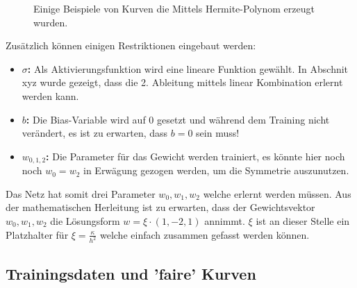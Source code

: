 \begin{figure}
	\centering
	
	\label{fig:mst_neuronalnetworkdemo}
	\caption{Einige Beispiele von Kurven die Mittels Hermite-Polynom erzeugt wurden.}
\end{figure}

Zusätzlich können einigen Restriktionen eingebaut werden:
\begin{itemize}
	\item {\textbf{$\sigma$:} Als Aktivierungsfunktion wird eine lineare Funktion gewählt. In Abschnit xyz wurde gezeigt, dass die 2. Ableitung mittels linear Kombination erlernt werden kann.}
	\item {\textbf{$b$: } Die Bias-Variable wird auf 0 gesetzt und während dem Training nicht verändert, es ist zu erwarten, dass $b=0$ sein muss!}
	\item {\textbf{$w_{0,1,2}$: } Die Parameter für das Gewicht werden trainiert, es könnte hier noch noch $w_0 = w_2$ in Erwägung gezogen werden, um die Symmetrie auszunutzen.}
\end{itemize}
Das Netz hat somit drei Parameter $w_0, w_1, w_2$ welche erlernt werden müssen. Aus der mathematischen Herleitung ist zu erwarten, dass der Gewichtsvektor  $w_0, w_1, w_2$ die Lösungsform $w = \xi \cdot (1, -2, 1)$ annimmt. $\xi$ ist an dieser Stelle ein Platzhalter für $\xi = \frac{\kappa}{h^{2}}$ welche einfach zusammen gefasst werden können.

\subsection{Trainingsdaten und 'faire' Kurven}
